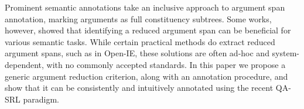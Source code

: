 Prominent semantic annotations take an inclusive approach to argument span annotation, marking arguments as full constituency subtrees. Some works, however, showed that identifying a reduced argument span can be beneficial for various semantic tasks. While certain practical methods do extract reduced argument spans, such as in Open-IE, these solutions are often ad-hoc and system-dependent, with no commonly accepted standards. In this paper we propose a generic argument reduction criterion, along with an annotation procedure, and show that it can be consistently and intuitively annotated using the recent QA-SRL paradigm.

